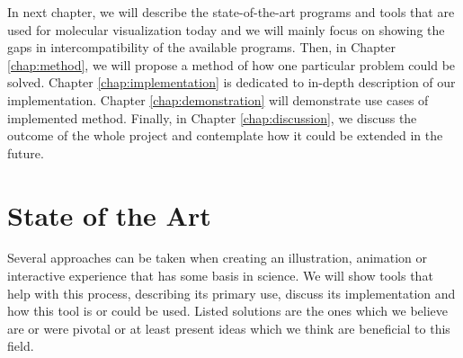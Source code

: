 \documentclass[
  digital, %
  table,   %
  nolof,     %
  nolot,     %
]{fithesis3}
\begin{document}



In next chapter, we will describe the state-of-the-art programs and tools that are used for molecular visualization today and we will mainly focus on showing the gaps in intercompatibility of the available programs. Then, in Chapter \ref{chap:method}, we will propose a method of how one particular problem could be solved. Chapter \ref{chap:implementation} is dedicated to in-depth description of our implementation. Chapter \ref{chap:demonstration} will demonstrate use cases of implemented method. Finally, in Chapter \ref{chap:discussion}, we discuss the outcome of the whole project and contemplate how it could be extended in the future.

\chapter{State of the Art}
\label{chap:star}
Several approaches can be taken when creating an illustration, animation or interactive experience that has some basis in science. We will show tools that help with this process, describing its primary use, discuss its implementation and how this tool is or could be used. Listed solutions are the ones which we believe are or were pivotal or at least present ideas which we think are beneficial to this field.
\end{document}
